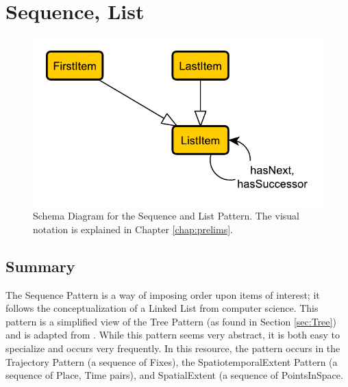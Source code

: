 \section{Sequence, List}
\label{sec:Sequence}
\begin{figure}[h!]
\begin{center}
\includegraphics[width=.8\textwidth]{figures/sequence}
\end{center}
\caption{Schema Diagram for the Sequence and List Pattern. The visual notation is explained in Chapter \ref{chap:prelims}.}
\label{fig:Spatiotemporal}
\label{fig:Sequence,}
\end{figure}
\subsection{Summary}
\label{sum:Sequence}
The \textsf{Sequence} Pattern is a way of imposing order upon items of interest; it follows the conceptualization of a Linked List from computer science. This pattern is a simplified view of the \textsf{Tree} Pattern (as found in Section \ref{sec:Tree}) and is adapted from \cite{tree}. While this pattern seems very abstract, it is both easy to specialize and occurs very frequently. In this resource, the pattern occurs in the \textsf{Trajectory} Pattern (a sequence of Fixes), the \textsf{SpatiotemporalExtent} Pattern (a sequence of \textsf{Place}, \textsf{Time} pairs), and \textsf{SpatialExtent} (a sequence of \textsf{PointsInSpace}.


